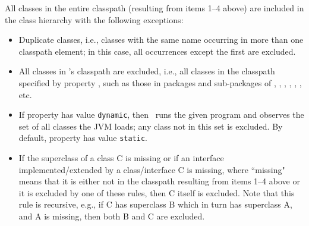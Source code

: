 All classes in the entire classpath (resulting from items 1--4 above) are included in the class hierarchy
with the following exceptions:
\begin{itemize}
\item
Duplicate classes, i.e., classes with the same name occurring in more than one classpath element;
in this case, all occurrences except the first are excluded. 
\item
All classes in \Chord's classpath are excluded, i.e., all classes in the classpath specified by property ,
such as those in packages and sub-packages of , , , , , , etc.
\item
If property  has value {\tt dynamic}, then \Chord\ runs the given program and
observes the set of all classes the JVM loads; any class not in this set is excluded.
By default, property  has value {\tt static}.
\item
If the superclass of a class C is missing or if an interface implemented/extended by a class/interface
C is missing, where ``missing" means that it is either not in the classpath resulting from items 1--4 above
or it is excluded by one of these rules, then C itself is excluded.  Note that this rule is recursive, e.g.,
if C has superclass B which in turn has superclass A, and A is missing, then both B and C are
excluded.
\end{itemize}



